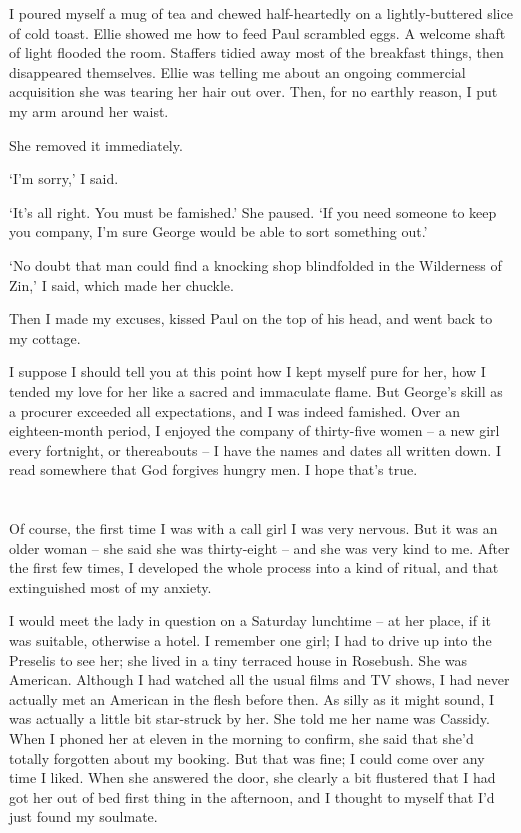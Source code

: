I poured myself a mug of tea and chewed half-heartedly on a lightly-buttered slice of cold toast. Ellie showed me how to feed Paul scrambled eggs. A welcome shaft of light flooded the room. Staffers tidied away most of the breakfast things, then disappeared themselves. Ellie was telling me about an ongoing commercial acquisition she was tearing her hair out over. Then, for no earthly reason, I put my arm around her waist.

She removed it immediately.

`I'm sorry,' I said.

`It's all right. You must be famished.' She paused. `If you need someone to keep you company, I'm sure George would be able to sort something out.'

`No doubt that man could find a knocking shop blindfolded in the Wilderness of Zin,' I said, which made her chuckle.

Then I made my excuses, kissed Paul on the top of his head, and went back to my cottage.

I suppose I should tell you at this point how I kept myself pure for her, how I tended my love for her like a sacred and immaculate flame. But George's skill as a procurer exceeded all expectations, and I was indeed famished. Over an eighteen-month period, I enjoyed the company of thirty-five women -- a new girl every fortnight, or thereabouts -- I have the names and dates all written down. I read somewhere that God forgives hungry men. I hope that's true.

\section{}

Of course, the first time I was with a call girl I was very nervous. But it was an older woman -- she said she was thirty-eight -- and she was very kind to me. After the first few times, I developed the whole process into a kind of ritual, and that extinguished most of my anxiety.

I would meet the lady in question on a Saturday lunchtime -- at her place, if it was suitable, otherwise a hotel. I remember one girl; I had to drive up into the Preselis to see her; she lived in a tiny terraced house in Rosebush. She was American. Although I had watched all the usual films and TV shows, I had never actually met an American in the flesh before then. As silly as it might sound, I was actually a little bit star-struck by her. She told me her name was Cassidy. When I phoned her at eleven in the morning to confirm, she said that she'd totally forgotten about my booking. But that was fine; I could come over any time I liked. When she answered the door, she clearly a bit flustered that I had got her out of bed first thing in the afternoon, and I thought to myself that I'd just found my soulmate.

